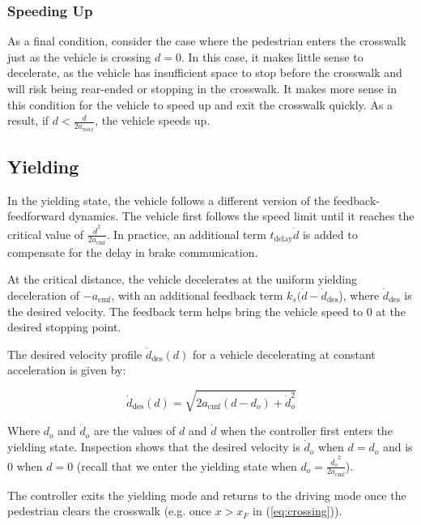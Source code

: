 \documentclass[letterpaper, 10 pt, conference]{ieeeconf}  %
\begin{document}
\subsubsection{Speeding Up}

As a final condition, consider the case where the pedestrian enters the crosswalk just as the vehicle is crossing $d = 0$. In this case, it makes little sense to decelerate, as the vehicle has insufficient space to stop before the crosswalk and will risk being rear-ended or stopping in the crosswalk. It makes more sense in this condition for the vehicle to speed up and exit the crosswalk quickly. As a result, if $d < \frac{\dot{d}}{2a_{max}}$, the vehicle speeds up. 

\subsection{Yielding}

In the yielding state, the vehicle follows a different version of the feedback-feedforward dynamics. The vehicle first follows the speed limit until it reaches the critical value of $\frac{\dot{d}^2}{2a_\mathrm{cmf}}$. In practice, an additional term $t_\mathrm{delay}\dot{d}$ is added to compensate for the delay in brake communication. 

At the critical distance, the vehicle decelerates at the uniform yielding deceleration of $-a_\mathrm{cmf}$, with an additional feedback term $k_s(\dot{d} - \dot{d}_\mathrm{des}$), where $\dot{d}_\mathrm{des}$ is the desired velocity. The feedback term helps bring the vehicle speed to 0 at the desired stopping point. 

The desired velocity profile $\dot{d}_\mathrm{des}(d)$ for a vehicle decelerating at constant acceleration is given by: 

\begin{equation}
\dot{d}_\mathrm{des}(d) = \sqrt{2a_\mathrm{cmf}(d-d_o) + \dot{d}_o^2}
\end{equation}

Where $d_o$ and $\dot{d}_o$ are the values of $d$ and $\dot{d}$ when the controller first enters the yielding state. Inspection shows that the desired velocity is $\dot{d}_o$ when $d = d_o$ and is 0 when $d = 0$ (recall that we enter the yielding state when $d_o = \frac{\dot{d_o}^2}{2a_\mathrm{cmf}}$). 

The controller exits the yielding mode and returns to the driving mode once the pedestrian clears the crosswalk (e.g. once $x > x_F$ in (\ref{eq:crossing})). 
\end{document}
